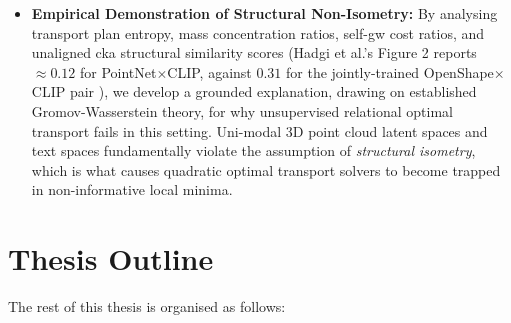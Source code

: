 \begin{itemize}
\item \textbf{Empirical Demonstration of Structural Non-Isometry:} By analysing transport plan entropy, mass concentration ratios, self-\gls{gw} cost ratios, and unaligned \gls{cka} structural similarity scores (Hadgi et al.'s Figure 2 reports $\approx 0.12$ for PointNet$\times$CLIP, against $0.31$ for the jointly-trained OpenShape$\times$CLIP pair \cite{hadgi2025escaping}), we develop a grounded explanation, drawing on established Gromov-Wasserstein theory, for why unsupervised relational optimal transport fails in this setting. Uni-modal 3D point cloud latent spaces and text spaces fundamentally violate the assumption of \emph{structural isometry}, which is what causes quadratic optimal transport solvers to become trapped in non-informative local minima.

\end{itemize}

\section{Thesis Outline}
\label{subsec:thesis_structure}


The rest of this thesis is organised as follows:

